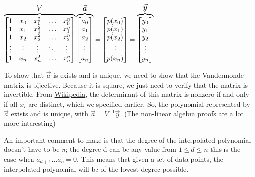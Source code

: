 \documentclass{article}
\begin{document}
\centerline{
    $
    \overbrace{
        \begin{bmatrix}
            1 & x_0 & x_0^2 & \ldots & x_0^n \\
            1 & x_1 & x_1^2 & \ldots & x_1^n \\
            1 & x_2 & x_2^2 & \ldots & x_2^n \\
            \vdots & \vdots & \vdots & \ddots & \vdots \\
            1 & x_n & x_n^2 & \ldots & x_n^n \\
        \end{bmatrix}
    }^{\text{\large $V$}}
    \overbrace{
        \begin{bmatrix}
            a_0 \\ a_1 \\ a_2 \\ \vdots \\ a_n 
        \end{bmatrix}
    }^{\text{\large $\vec{a}$}} = 
    \begin{bmatrix}
        p(x_0) \\ p(x_1) \\ p(x_2) \\ \vdots \\ p(x_n) 
    \end{bmatrix} = 
    \overbrace{
        \begin{bmatrix}
            y_0 \\ y_1 \\ y_2 \\ \vdots \\ y_n 
        \end{bmatrix}
    }^{\text{\large $\vec{y}$}}
    $
}

To show that $\vec{a}$ is exists and is unique, we need to show that the Vandermonde matrix is bijective. Because it is square, we just need to verify that the matrix is invertible. From \href{https://en.wikipedia.org/wiki/Vandermonde_matrix}{Wikipedia}, the determinant of this matrix is nonzero if and only if all $x_i$ are distinct, which we specified earlier. So, the polynomial represented by $\vec{a}$ exists and is unique, with $\vec{a}=V^{-1}\vec{y}$. (The non-linear algebra proofs are a lot more interesting)

An important comment to make is that the degree of the interpolated polynomial doesn't have to be $n$; the degree d can be any value from $1\le d\le n$ this is the case when $a_{d+1} \ldots a_n=0$. This means that given a set of data points, the interpolated polynomial will be of the lowest degree possible.
\end{document}
